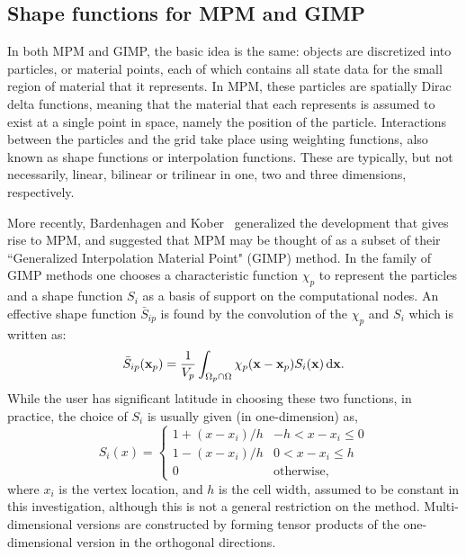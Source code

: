 \subsection{Shape functions for MPM and GIMP} \label{gimp_mpm}

In both MPM and GIMP, the basic idea is the same: objects are discretized into
particles, or material points, each of which contains all state data for the
small region of material that it represents.  In MPM, these particles are spatially
Dirac delta functions, meaning that the material that each represents is
assumed to exist at a single point in space, namely the position of the
particle.  Interactions between the particles and the grid take place
using weighting functions, also known as shape functions or interpolation
functions.  These are typically, but not necessarily, linear, bilinear or
trilinear in one, two and three dimensions, respectively.

More recently, Bardenhagen and Kober~\cite{bardgimp} generalized the
development that gives rise to MPM, and suggested that MPM
may be thought of as a subset of their ``Generalized Interpolation
Material Point" (GIMP) method.  In the family of GIMP methods
one chooses a characteristic function $\chi_p$ to represent
the particles and a shape function $S_i$ as a basis of support on the
computational nodes.  An effective shape function $\bar{S}_{ip}$  is found
by the convolution of the $\chi_p$ and $S_i$ which is written as:
\begin{equation}
\bar{S}_{ip}({\bf x}_p) = \frac{1}{V_p}  \int_{\Omega_p \cap \Omega} \chi_p({\bf x} - {\bf x}_p) S_i({\bf x})\,\mathrm{d}{\bf x} .
\label{effectiveS}
\end{equation}
While the user has significant latitude in choosing
these two functions, in practice, the choice of $S_i$ is usually given
(in one-dimension) as,
\begin{equation}
S_i\left(x\right) = \begin{cases} 1 + {\left(x-x_i\right) / h} & {-h < x-x_i \le 0} \\
                    1 - {\left(x-x_i\right) / h} & {0  < x-x_i \le h} \\
                    0 & \text{otherwise},
       \end{cases}
\label{linear_shape}
\end{equation}
where $x_i$ is the vertex location, and $h$ is the cell width, 
assumed to be constant in this investigation, 
although this is not a general restriction on the method.
Multi-dimensional versions are constructed by forming tensor products of the
one-dimensional version in the orthogonal directions.  

